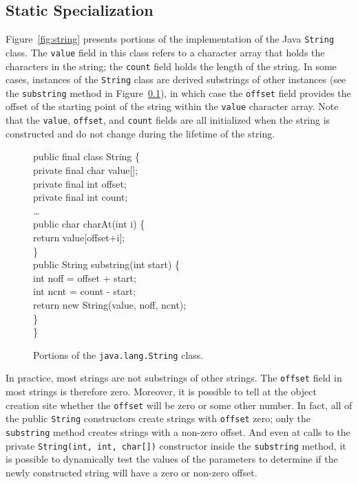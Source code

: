 \documentclass[preprint]{acmconf}
\begin{document}
\subsection{Static Specialization} 

Figure~\ref{fig:string} presents portions of the implementation
of the Java {\tt String} class. The {\tt value} field in this
class refers to a character array that holds the characters
in the string; the {\tt count} field holds the length of the
string. In some cases, instances of the {\tt String} class
are derived substrings of other instances 
(see the {\tt substring} method in Figure~\ref{}), in which case the
{\tt offset} field provides the offset of the starting 
point of the string within the {\tt value} character array. 
Note that the {\tt value}, {\tt offset}, and {\tt count} 
fields are all initialized when the string is constructed
and do not change during the lifetime of the string.

\begin{figure}
\begin{samplecode}
public final class String \{\\
\>private final char value[];\\
\>private final int offset;\\
\>private final int count;\\
\>\ldots\\
\>public char charAt(int i) \{\\
\>\>return value[offset+i];\\
\>\}\\
\>public String substring(int start) \{\\
\>\>int noff = offset + start;\\
\>\>int ncnt = count - start;\\
\>\>return new String(value, noff, ncnt);\\
\>\}\\
\}\\
\end{samplecode}
\caption{Portions of the {\tt java.lang.String} class.}
\label{fig:string-fields}
\end{figure}

In practice, most strings are not substrings of other strings. 
The {\tt offset} field in most strings is therefore zero.
Moreover, it is possible to tell at the object creation site
whether the {\tt offset} will be zero or some other number.
In fact, all of the public {\tt String} constructors create
strings with {\tt offset} zero; only the {\tt substring} method
creates strings with a non-zero offset. And even at 
calls to the private {\tt String(int, int, char[])} constructor
inside the {\tt substring} method, it is possible to dynamically
test the values of the parameters to determine if the newly
constructed string will have a zero or non-zero offset.
\end{document}
